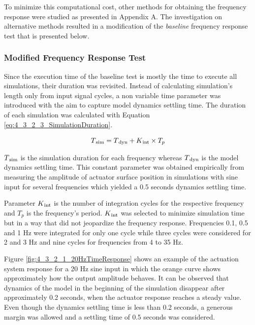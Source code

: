 To minimize this computational cost, other methods for obtaining the frequency response were studied as presented in Appendix A. The investigation on alternative methods resulted in a modification of the \textit{baseline} frequency response test that is presented below.

\subsubsection{Modified Frequency Response Test}

Since the execution time of the baseline test is mostly the time to execute all simulations, their duration was revisited. Instead of calculating simulation's length only from input signal cycles, a non variable time parameter was introduced with the aim to capture model dynamics settling time. The duration of each simulation was calculated with Equation \ref{eq:4_3_2_3_SimulationDuration}.

\begin{equation}
\label{eq:4_3_2_3_SimulationDuration}
T\textsubscript{sim} = T\textsubscript{dyn} + K\textsubscript{int} \times T_p
\end{equation}

$T\textsubscript{sim}$ is the simulation duration for each frequency whereas $T\textsubscript{dyn}$ is the model dynamics settling time. This constant parameter was obtained empirically from measuring the amplitude of actuator surface position in simulations with sine input for several frequencies which yielded a 0.5 seconds dynamics settling time. 

Parameter $K\textsubscript{int}$ is the number of integration cycles for the respective frequency and $T_p$ is the frequency's period. $K\textsubscript{int}$ was selected to minimize simulation time but in a way that did not jeopardize the frequency response. Frequencies 0.1, 0.5 and 1 Hz were integrated for only one cycle while three cycles were considered for 2 and 3 Hz and nine cycles for frequencies from 4 to 35 Hz. 

Figure \ref{fig:4_3_2_1_20HzTimeResponse} shows an example of the actuation system response for a 20 Hz sine input in which the orange curve shows approximately how the output amplitude behaves. It can be observed that dynamics of the model in the beginning of the simulation disappear after approximately 0.2 seconds, when the actuator response reaches a steady value. Even though the dynamics settling time is less than 0.2 seconds, a generous margin was allowed and a settling time of 0.5 seconds was considered.

